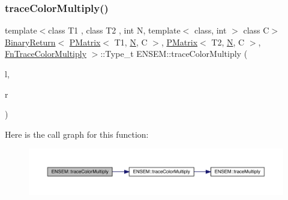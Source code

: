 \subsubsection{\texorpdfstring{traceColorMultiply()}{traceColorMultiply()}\hspace{0.1cm}{\footnotesize\ttfamily [1/3]}}
{\footnotesize\ttfamily template$<$class T1 , class T2 , int N, template$<$ class, int $>$ class C$>$ \\
\mbox{\hyperlink{structENSEM_1_1BinaryReturn}{Binary\+Return}}$<$ \mbox{\hyperlink{classENSEM_1_1PMatrix}{P\+Matrix}}$<$ T1, \mbox{\hyperlink{adat__devel_2lib_2hadron_2operator__name__util_8cc_a7722c8ecbb62d99aee7ce68b1752f337}{N}}, C $>$, \mbox{\hyperlink{classENSEM_1_1PMatrix}{P\+Matrix}}$<$ T2, \mbox{\hyperlink{adat__devel_2lib_2hadron_2operator__name__util_8cc_a7722c8ecbb62d99aee7ce68b1752f337}{N}}, C $>$, \mbox{\hyperlink{structENSEM_1_1FnTraceColorMultiply}{Fn\+Trace\+Color\+Multiply}} $>$\+::Type\+\_\+t E\+N\+S\+E\+M\+::trace\+Color\+Multiply (\begin{DoxyParamCaption}\item[{const \mbox{\hyperlink{classENSEM_1_1PMatrix}{P\+Matrix}}$<$ T1, \mbox{\hyperlink{adat__devel_2lib_2hadron_2operator__name__util_8cc_a7722c8ecbb62d99aee7ce68b1752f337}{N}}, C $>$ \&}]{l,  }\item[{const \mbox{\hyperlink{classENSEM_1_1PMatrix}{P\+Matrix}}$<$ T2, \mbox{\hyperlink{adat__devel_2lib_2hadron_2operator__name__util_8cc_a7722c8ecbb62d99aee7ce68b1752f337}{N}}, C $>$ \&}]{r }\end{DoxyParamCaption})\hspace{0.3cm}{\ttfamily [inline]}}

Here is the call graph for this function\+:\nopagebreak
\begin{figure}[H]
\begin{center}
\leavevmode
\includegraphics[width=350pt]{df/d0a/group__primmatrix_ga017dba078c2a41f5ca2a8d2b934b20aa_cgraph}
\end{center}
\end{figure}
\mbox{\label{group__primmatrix_ga34f5dfd94ab05f405e04e73c9e342aeb}} 

